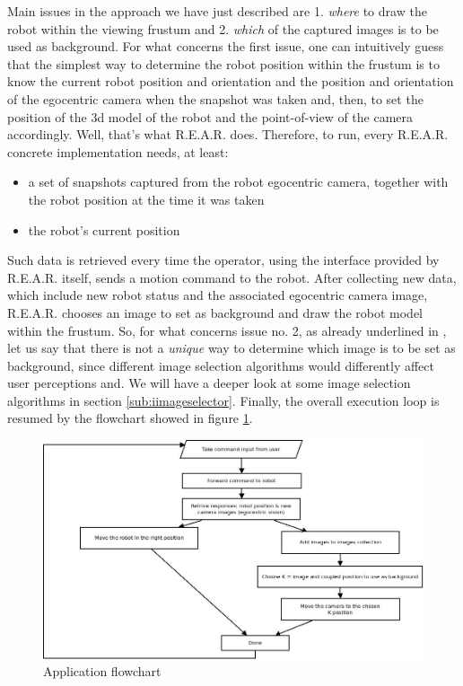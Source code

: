%
Main issues in the approach we have just described are 1. 
\textit{where} to draw the robot within the viewing frustum 
and 2. \textit{which} of the captured images is to be used 
as background.
%
For what concerns the first issue, one can intuitively guess 
that the simplest way to determine the robot position 
within the frustum is to know the current robot position 
and orientation and the position and orientation of the egocentric 
camera when the snapshot was taken and, then, to set the 
position of the 3d model of the robot and the point-of-view 
of the camera accordingly.
Well, that's what \textsf{R.E.A.R.} does.
%
Therefore, to run, every \textsf{R.E.A.R.} concrete implementation 
needs, at least:
%
\begin{itemize}
  \item a set of snapshots captured from the robot egocentric camera, 
    together with the robot position at the time it was taken
  \item the robot's current position
\end{itemize}
%
Such data is retrieved every time the operator, using the 
interface provided by \textsf{R.E.A.R.} itself, sends a 
motion command to the robot.
%
After collecting new data, which include new robot status and
the associated egocentric camera image, \textsf{R.E.A.R.} chooses 
an image to set as background and draw the robot model within 
the frustum. So, for what concerns issue no. 2, as already 
underlined in \cite{sugimoto}, let us say that there is not 
a \textit{unique} way to determine which image is to be set 
as background, since different image selection algorithms 
would differently affect user perceptions and. We will have a 
deeper look at some image selection algorithms in section
\ref{sub:iimageselector}.
%
Finally, the overall execution loop is resumed by the flowchart 
showed in figure \ref{fig:overall_diagram}.
%
\begin{figure}[!h]
  \begin{center}
    \includegraphics[width=400pt]{img/overall_diagram.jpeg}  %
    \caption{Application flowchart}
    \label{fig:overall_diagram}
  \end{center}
\end{figure}

